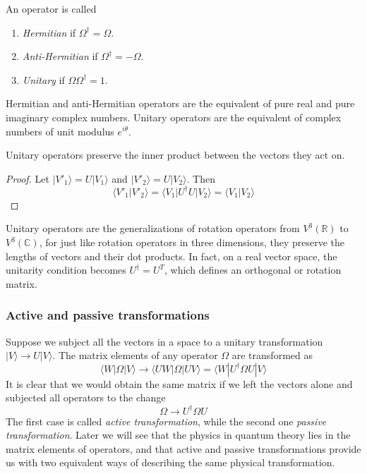 \documentclass[11pt,fleqn]{book} %
\newcommand{\bra}[1]{\langle #1|}
\newcommand{\ket}[1]{| #1\rangle}
\newcommand{\scalar}[2]{\langle #1| #2\rangle}
\begin{document}
\begin{definition}
    An operator is called 
    \begin{enumerate}
        \item \textit{Hermitian} if $\Omega^\dagger=\Omega$.
        \item \textit{Anti-Hermitian} if $\Omega^\dagger=-\Omega$.
        \item \textit{Unitary} if $\Omega\Omega^\dagger=1$.
    \end{enumerate}
\end{definition}

\begin{remark}
    Hermitian and anti-Hermitian operators are the equivalent of pure real and pure imaginary complex numbers. Unitary operators
    are the equivalent of complex numbers of unit modulus $e^{i\theta}$.
\end{remark}

\begin{theorem}
    Unitary operators preserve the inner product between the vectors they act on.
\end{theorem}
\begin{proof}
    Let $\ket{V'_1}=U\ket{V_1}$ and $\ket{V'_2}=U\ket{V_2}$. Then 
    \begin{equation*}
        \scalar{V'_1}{V'_2} = \bra{V_1}U^\dagger U\ket{V_2} = \scalar{V_1}{V_2}
    \end{equation*}
\end{proof}

\begin{remark}
    Unitary operators are the generalizations of rotation operators from $V^3(\mathbb{R})$ to $V^3(\mathbb{C})$,
    for just like rotation operators in three dimensions, they preserve the lengths of vectors and their dot products. 
    In fact, on a real vector space, the unitarity condition becomes $U^\dagger=U^T$, which defines an orthogonal or
    rotation matrix.
\end{remark}

\subsubsection{Active and passive transformations}
Suppose we subject all the vectors in a space to a unitary transformation $\ket{V}\rightarrow U\ket{V}$.
The matrix elements of any operator $\Omega$ are transformed as 
\begin{equation*}
    \bra{W}\Omega\ket{V}\rightarrow \bra{UW}\Omega\ket{UV}=\bra{W}U^\dagger\Omega U\ket{V}
\end{equation*}
It is clear that we would obtain the same matrix if we left the vectors alone and subjected all operators
to the change
\begin{equation*}
    \Omega\rightarrow U^\dagger\Omega U
\end{equation*}
The first case is called \textit{active transformation}, while the second one \textit{passive transformation}.
Later we will see that the physics in quantum theory lies in the matrix elements of operators, and that active and
passive transformations provide us with two equivalent ways of describing the same physical transformation.
\end{document}
